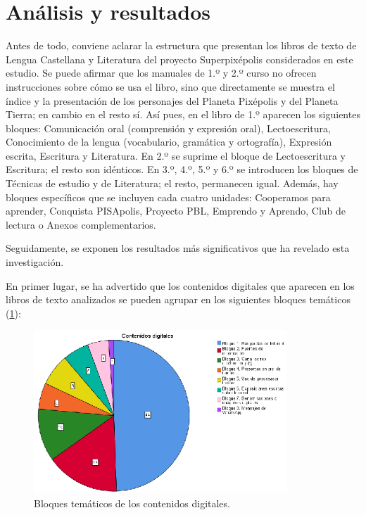 \documentclass{textolivre}
\begin{document}

\section{Análisis y resultados}\label{sec-analisis}
Antes de todo, conviene aclarar la estructura que presentan los libros de texto de Lengua Castellana y Literatura del proyecto Superpixépolis considerados en este estudio. Se puede afirmar que los manuales de 1.º y 2.º curso no ofrecen instrucciones sobre cómo se usa el libro, sino que directamente se muestra el índice y la presentación de los personajes del Planeta Pixépolis y del Planeta Tierra; en cambio en el resto sí. Así pues, en el libro de 1.º aparecen los siguientes bloques: Comunicación oral (comprensión y expresión oral), Lectoescritura, Conocimiento de la lengua (vocabulario, gramática y ortografía), Expresión escrita, Escritura y Literatura. En 2.º se suprime el bloque de Lectoescritura y Escritura; el resto son idénticos. En 3.º, 4.º, 5.º y 6.º se introducen los bloques de Técnicas de estudio y de Literatura; el resto, permanecen igual. Además, hay bloques específicos que se incluyen cada cuatro unidades: Cooperamos para aprender, Conquista PISApolis, Proyecto PBL, Emprendo y Aprendo, Club de lectura o Anexos complementarios.

Seguidamente, se exponen los resultados más significativos que ha revelado esta investigación.  

En primer lugar, se ha advertido que los contenidos digitales que aparecen en los libros de texto analizados se pueden agrupar en los siguientes bloques temáticos (\cref{Fig01}):  

\begin{figure}[htbp]
 \centering
 \includegraphics[width=0.85\textwidth]{Fig01.eps}
 \caption{Bloques temáticos de los contenidos digitales.}
 \label{Fig01}
\end{figure}
\end{document}
